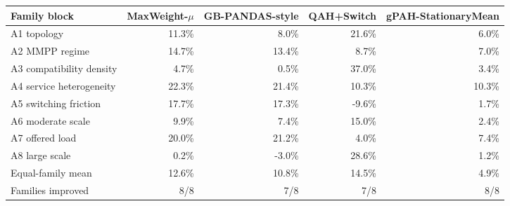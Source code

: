 \begin{tabular}{lrrrr}
\toprule
Family block & MaxWeight-$\mu$ & GB-PANDAS-style & QAH+Switch & gPAH-StationaryMean \\
\midrule
A1 topology & 11.3\% & 8.0\% & 21.6\% & 6.0\% \\
A2 MMPP regime & 14.7\% & 13.4\% & 8.7\% & 7.0\% \\
A3 compatibility density & 4.7\% & 0.5\% & 37.0\% & 3.4\% \\
A4 service heterogeneity & 22.3\% & 21.4\% & 10.3\% & 10.3\% \\
A5 switching friction & 17.7\% & 17.3\% & -9.6\% & 1.7\% \\
A6 moderate scale & 9.9\% & 7.4\% & 15.0\% & 2.4\% \\
A7 offered load & 20.0\% & 21.2\% & 4.0\% & 7.4\% \\
A8 large scale & 0.2\% & -3.0\% & 28.6\% & 1.2\% \\
\midrule
Equal-family mean & 12.6\% & 10.8\% & 14.5\% & 4.9\% \\
Families improved & 8/8 & 7/8 & 7/8 & 8/8 \\
\bottomrule
\end{tabular}

